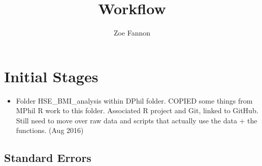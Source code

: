 \documentclass[]{article}
\title{Workflow}
\author{Zoe Fannon}
\begin{document}
\maketitle
\section{Initial Stages}
\begin{itemize}
\item Folder HSE\_BMI\_analysis within DPhil folder. COPIED some things from MPhil R work to this folder. Associated R project and Git, linked to GitHub. Still need to move over raw data and scripts that actually use the data + the functions. (Aug 2016)
\end{itemize}
\subsection{Standard Errors}
\end{document}

